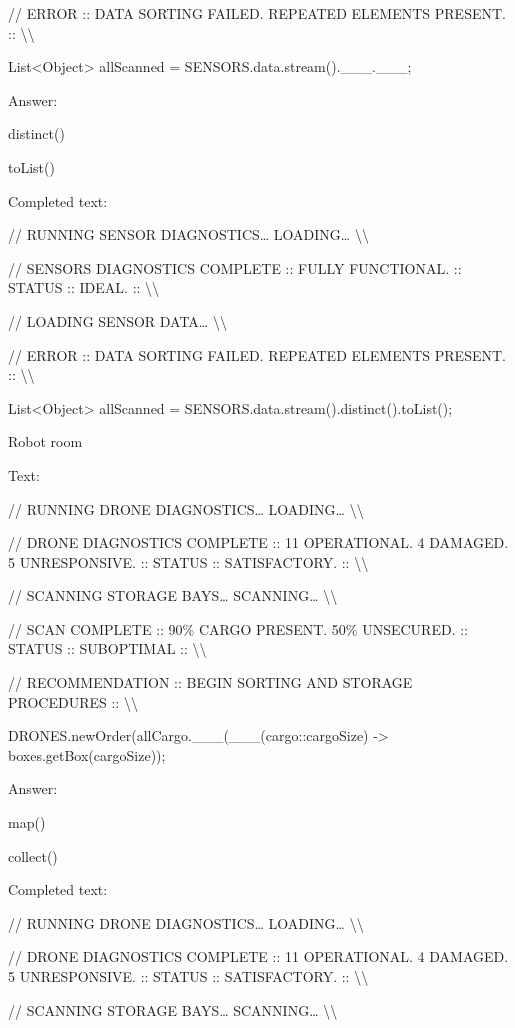 \documentclass[
]{article}
\begin{document}
// ERROR :: DATA SORTING FAILED. REPEATED ELEMENTS PRESENT. ::
\textbackslash\textbackslash{}

List\textless Object\textgreater{} allScanned =
SENSORS.data.stream().\_\_\_.\_\_\_;

Answer:

distinct()

toList()

Completed text:

// RUNNING SENSOR DIAGNOSTICS\ldots{} LOADING\ldots{}
\textbackslash\textbackslash{}

// SENSORS DIAGNOSTICS COMPLETE :: FULLY FUNCTIONAL. :: STATUS :: IDEAL.
:: \textbackslash\textbackslash{}

// LOADING SENSOR DATA\ldots{} \textbackslash\textbackslash{}

// ERROR :: DATA SORTING FAILED. REPEATED ELEMENTS PRESENT. ::
\textbackslash\textbackslash{}

List\textless Object\textgreater{} allScanned =
SENSORS.data.stream().distinct().toList();

Robot room

Text:

// RUNNING DRONE DIAGNOSTICS\ldots{} LOADING\ldots{}
\textbackslash\textbackslash{}

// DRONE DIAGNOSTICS COMPLETE :: 11 OPERATIONAL. 4 DAMAGED. 5
UNRESPONSIVE. :: STATUS :: SATISFACTORY. ::
\textbackslash\textbackslash{}

// SCANNING STORAGE BAYS\ldots{} SCANNING\ldots{}
\textbackslash\textbackslash{}

// SCAN COMPLETE :: 90\% CARGO PRESENT. 50\% UNSECURED. :: STATUS ::
SUBOPTIMAL :: \textbackslash\textbackslash{}

// RECOMMENDATION :: BEGIN SORTING AND STORAGE PROCEDURES ::
\textbackslash\textbackslash{}

DRONES.newOrder(allCargo.\_\_\_(\_\_\_(cargo::cargoSize) -\textgreater{}
boxes.getBox(cargoSize));

Answer:

map()

collect()

Completed text:

// RUNNING DRONE DIAGNOSTICS\ldots{} LOADING\ldots{}
\textbackslash\textbackslash{}

// DRONE DIAGNOSTICS COMPLETE :: 11 OPERATIONAL. 4 DAMAGED. 5
UNRESPONSIVE. :: STATUS :: SATISFACTORY. ::
\textbackslash\textbackslash{}

// SCANNING STORAGE BAYS\ldots{} SCANNING\ldots{}
\textbackslash\textbackslash{}
\end{document}
